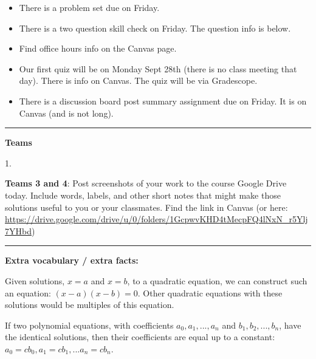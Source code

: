 \documentclass[12pt,letterpaper,noanswers]{exam}
\begin{document}
 \pdfpageheight 11in 
  \pdfpagewidth 8.5in

\noindent 





\begin{itemize}
\itemsep0em
    \item There is a problem set due on Friday.
    \item There is a two question skill check on Friday.  The question info is below.
    \item Find office hours info on the Canvas page.
    \item Our first quiz will be on Monday Sept 28th (there is no class meeting that day).  There is info on Canvas.  The quiz will be via Gradescope.
    \item There is a discussion board post summary assignment due on Friday.  It is on Canvas (and is not long).
\end{itemize}

\hrule
\vspace{0.2cm}


\noindent\textbf{Teams}

\begin{multicols}{2}
1. 
\end{multicols}

\noindent \textbf{Teams 3 and 4}: Post screenshots of your work to the course Google Drive today.  Include words, labels, and other short notes that might make those solutions useful to you or your classmates.  Find the link in Canvas (or here: \url{https://drive.google.com/drive/u/0/folders/1GcpwvKHD4tMecpFQ4lNxN_r5Ylj7YHbd})


\vspace{0.2cm}
\hrule
\vspace{0.2cm}


\noindent \textbf{Extra vocabulary / extra facts:}
\begin{tcolorbox}

Given solutions, $x = a$ and $x = b$, to a quadratic equation, we can construct such an equation: $(x-a)(x-b) = 0$.  Other quadratic equations with these solutions would be multiples of this equation.

If two polynomial equations, with coefficients $a_0, a_1, ..., a_n$ and $b_1, b_2, ..., b_n$, have the identical solutions, then their coefficients are equal up to a constant: $a_0 = c b_0, a_1 = c b_1, ... a_n = c b_n$.
\end{tcolorbox}
\end{document}
